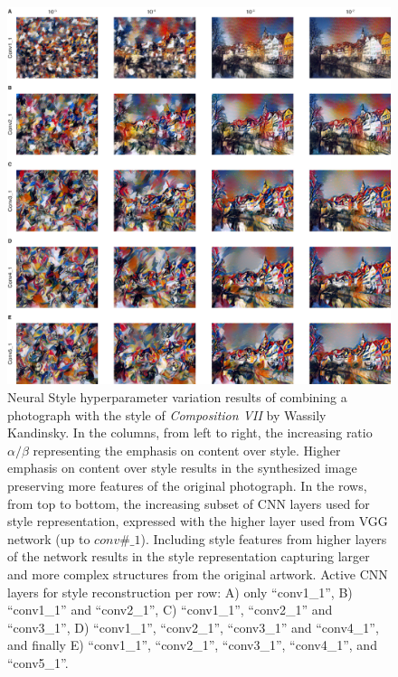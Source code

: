 \begin{figure}[p]
  \includegraphics[width=\textwidth]{gfx/neural-style-results}
  \caption{
    Neural Style hyperparameter variation results of combining a photograph with the style of \emph{Composition VII} by Wassily Kandinsky.
    In the columns, from left to right, the increasing ratio $\alpha / \beta$ representing the emphasis on content over style.
    Higher emphasis on content over style results in the synthesized image preserving more features of the original photograph.
    In the rows, from top to bottom, the increasing subset of CNN layers used for style representation, expressed with the higher layer used from VGG network (up to $conv\#\_1$).
    Including style features from higher layers of the network results in the style representation capturing larger and more complex structures from the original artwork.
    Active CNN layers for style reconstruction per row: A) only ``conv1\_1'', B) ``conv1\_1'' and ``conv2\_1'', C) ``conv1\_1'', ``conv2\_1'' and ``conv3\_1'', D) ``conv1\_1'', ``conv2\_1'', ``conv3\_1'' and ``conv4\_1'', and finally E) ``conv1\_1'', ``conv2\_1'', ``conv3\_1'', ``conv4\_1'', and ``conv5\_1''.
  }
  \label{fig:system:results}
\end{figure}

